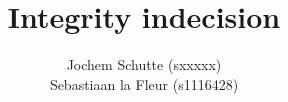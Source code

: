 \documentclass[a4paper]{report}
\title{Integrity indecision}
\author{Jochem Schutte (sxxxxx) \\ Sebastiaan la Fleur (s1116428)}
\begin{document}
	\maketitle
    \tableofcontents

	
	
	
	\cite{trans_in_dist_sys}

	
	
\end{document}
